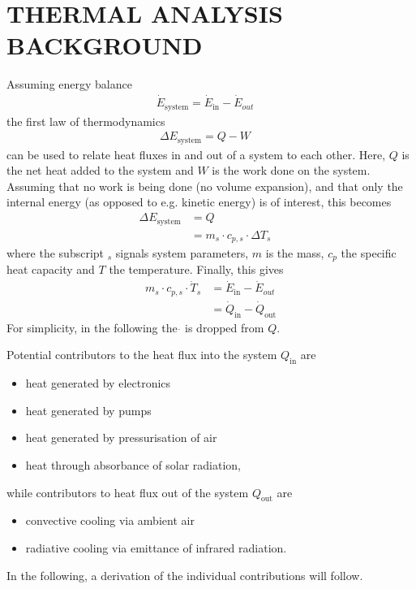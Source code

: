 \documentclass[
  a4paper,
  11pt,
  openany,
  parskip,
  toc=totoc,
  listof=totoc,
  bibliography=totoc
]{scrreprt}
\newcommand{\qc}{\quad}
\begin{document}
\chapter{THERMAL ANALYSIS BACKGROUND}
\label{app:thermal_background}
Assuming energy balance
\begin{align}
    \dot{E}_{\mathrm{system}}=\dot{E}_{\mathrm{in}}-\dot{E}_{out}\qc
\end{align}
the first law of thermodynamics 
\begin{align}
    \Delta E_\mathrm{system}=Q-W\qc
\end{align}
can be used to relate heat fluxes in and out of a system to each other. Here, $Q$ is the net heat added to the system and $W$ is the work done on the system. Assuming that no work is being done (no volume expansion), and that only the internal energy (as opposed to e.g. kinetic energy) is of interest, this becomes
\begin{align}
    \Delta {E}_\mathrm{system}&=Q\\ 
    &=m_s\cdot c_{p,s} \cdot \Delta {T}_s\qc
\end{align}
where the subscript $_s$ signals system parameters, $m$ is the mass, $c_p$ the specific heat capacity and $T$ the temperature. Finally, this gives 
\begin{align}
    m_s\cdot c_{p,s} \cdot \dot{T}_s &= \dot{E}_{\mathrm{in}}-\dot{E}_{out}\\ 
    &= \dot{Q}_\mathrm{in}-\dot{Q}_\mathrm{out}
\end{align}
For simplicity, in the following the $\dot{}$ is dropped from $Q$. 

Potential contributors to the heat flux into the system $Q_\mathrm{in}$ are 
\begin{itemize}
    \item heat generated by electronics 
    \item heat generated by pumps 
    \item heat generated by pressurisation of air 
    \item heat through absorbance of solar radiation,
\end{itemize}
while contributors to heat flux out of the system $Q_\mathrm{out}$ are 
\begin{itemize}
    \item convective cooling via ambient air
    \item radiative cooling via emittance of infrared radiation.
\end{itemize}
In the following, a derivation of the individual contributions will follow. 
\end{document}
